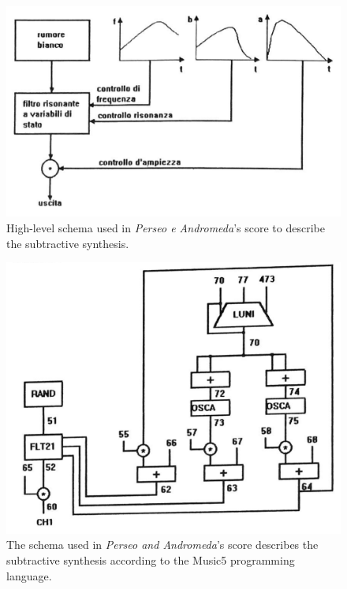 \begin{figure}[!h]
    \centering
    \includegraphics[width=\linewidth]{chapters/appendix/c/image/figc-perseo-schema01.png}
    \caption{High-level schema used in \textit{Perseo e Andromeda}’s score to describe the subtractive synthesis.}
    \label{fig:ac-perseo-schema01}
\end{figure}

\begin{figure}[!h]
    \centering
    \includegraphics[width=\linewidth]{chapters/appendix/c/image/figc-perseo-schema02.png}
    \caption{The schema used in \textit{Perseo and Andromeda}’s score describes the subtractive synthesis according to the Music5 programming language.}
    \label{fig:ac-perseo-schema02}
\end{figure}

